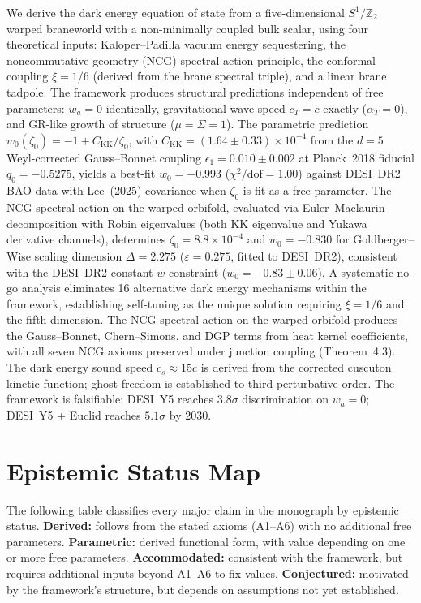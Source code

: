 \documentclass[10pt,a4paper,openany,twocolumn]{book}
\theoremstyle{definition}
\theoremstyle{remark}
\begin{document}
We derive the dark energy equation of state from a five-dimensional $S^1/\mathbb{Z}_2$ warped braneworld with a non-minimally coupled bulk scalar, using four theoretical inputs: Kaloper--Padilla vacuum energy sequestering, the noncommutative geometry (NCG) spectral action principle, the conformal coupling $\xi = 1/6$ (derived from the brane spectral triple), and a linear brane tadpole. The framework produces structural predictions independent of free parameters: $w_a = 0$ identically, gravitational wave speed $c_T = c$ exactly ($\alpha_T = 0$), and GR-like growth of structure ($\mu = \Sigma = 1$). The parametric prediction $w_0(\zeta_0) = -1 + C_{\mathrm{KK}}/\zeta_0$, with $C_{\mathrm{KK}} = (1.64 \pm 0.33) \times 10^{-4}$ from the $d = 5$ Weyl-corrected Gauss--Bonnet coupling $\epsilon_1 = 0.010 \pm 0.002$ at Planck~2018 fiducial $q_0 = -0.5275$, yields a best-fit $w_0 = -0.993$ ($\chi^2/\mathrm{dof} = 1.00$) against DESI~DR2 BAO data with Lee~(2025) covariance when $\zeta_0$ is fit as a free parameter. The NCG spectral action on the warped orbifold, evaluated via Euler--Maclaurin decomposition with Robin eigenvalues (both KK eigenvalue and Yukawa derivative channels), determines $\zeta_0 = 8.8 \times 10^{-4}$ and $w_0 = -0.830$ for Goldberger--Wise scaling dimension $\Delta = 2.275$ ($\varepsilon = 0.275$, fitted to DESI~DR2), consistent with the DESI~DR2 constant-$w$ constraint ($w_0 = -0.83 \pm 0.06$). A systematic no-go analysis eliminates 16 alternative dark energy mechanisms within the framework, establishing self-tuning as the unique solution requiring $\xi = 1/6$ and the fifth dimension. The NCG spectral action on the warped orbifold produces the Gauss--Bonnet, Chern--Simons, and DGP terms from heat kernel coefficients, with all seven NCG axioms preserved under junction coupling (Theorem~4.3). The dark energy sound speed $c_s \approx 15c$ is derived from the corrected cuscuton kinetic function; ghost-freedom is established to third perturbative order. The framework is falsifiable: DESI~Y5 reaches $3.8\sigma$ discrimination on $w_a = 0$; DESI~Y5 + Euclid reaches $5.1\sigma$ by 2030.

\chapter*{Epistemic Status Map}

\noindent
The following table classifies every major claim in the monograph by epistemic status.
\textbf{Derived:} follows from the stated axioms (A1--A6) with no additional free parameters.
\textbf{Parametric:} derived functional form, with value depending on one or more free parameters.
\textbf{Accommodated:} consistent with the framework, but requires additional inputs beyond A1--A6 to fix values.
\textbf{Conjectured:} motivated by the framework's structure, but depends on assumptions not yet established.
\end{document}
